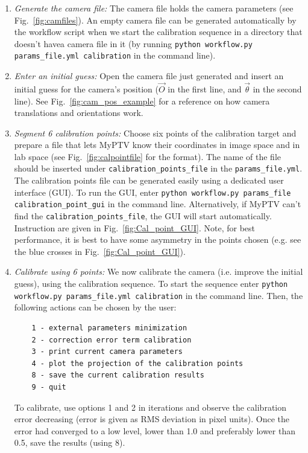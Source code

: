 \documentclass[10pt,a4paper]{article}
\begin{document}
\begin{enumerate}
	\item \textit{Generate the camera file:} The camera file holds the camera parameters (see Fig.~\ref{fig:camfiles}). An empty camera file can be generated automatically by the workflow script when we start the calibration sequence in a directory that doesn't havea  camera file in it (by running \texttt{python workflow.py params\_file.yml calibration} in the command line).
	
	\item \textit{Enter an initial guess:} Open the camera file just generated and insert an initial guess for the camera's position ($\vec{O}$ in the first line, and $\vec{\theta}$ in the second line). See Fig.~\ref{fig:cam_pos_example} for a reference on how camera translations and orientations work. 
	
	\item \textit{Segment 6 calibration points:} Choose six points of the calibration target and prepare a file that lets MyPTV know their coordinates in image space and in lab space (see Fig.~\ref{fig:calpointfile} for the format). The name of the file should be inserted under \texttt{calibration\_points\_file} in the \texttt{params\_file.yml}. \\
	The calibration points file can be generated easily using a dedicated user interface (GUI). To run the GUI, enter \texttt{python workflow.py params\_file calibration\_point\_gui} in the command line. Alternatively, if MyPTV can't find the \texttt{calibration\_points\_file}, the GUI will start automatically. Instruction are given in Fig.~\ref{fig:Cal_point_GUI}. Note, for best performance, it is best to have some asymmetry in the points chosen (e.g. see the blue crosses in Fig.~\ref{fig:Cal_point_GUI}).
	
	\item \textit{Calibrate using 6 points:} We now calibrate the camera (i.e. improve the initial guess), using the calibration sequence. To start the sequence enter \texttt{python workflow.py params\_file.yml calibration} in the command line. Then, the following actions can be chosen by the user:
	\begin{verbatim}
	1 - external parameters minimization 
	2 - correction error term calibration
	3 - print current camera parameters
	4 - plot the projection of the calibration points
	8 - save the current calibration results
	9 - quit
	\end{verbatim} 
	To calibrate, use options 1 and 2 in iterations and observe the calibration error decreasing (error is given as RMS deviation in pixel units). Once the error had converged to a low level, lower than 1.0 and preferably lower than 0.5, save the results (using 8).
\end{enumerate}
\end{document}

